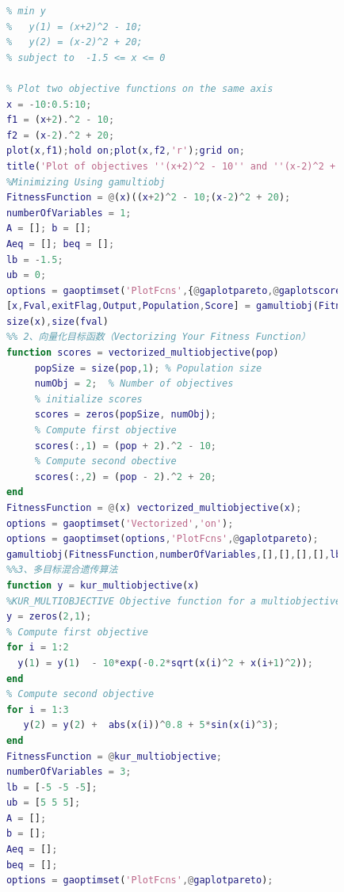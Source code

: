             \begin{lstlisting}[language = Matlab]
            %% 1、简单的多目标优化问题
            % min y
            %   y(1) = (x+2)^2 - 10;
            %   y(2) = (x-2)^2 + 20;
            % subject to  -1.5 <= x <= 0

            % Plot two objective functions on the same axis
            x = -10:0.5:10;
            f1 = (x+2).^2 - 10;
            f2 = (x-2).^2 + 20;
            plot(x,f1);hold on;plot(x,f2,'r');grid on;
            title('Plot of objectives ''(x+2)^2 - 10'' and ''(x-2)^2 + 20''');
            %Minimizing Using gamultiobj
            FitnessFunction = @(x)((x+2)^2 - 10;(x-2)^2 + 20);
            numberOfVariables = 1;
            A = []; b = [];
            Aeq = []; beq = [];
            lb = -1.5;
            ub = 0;
            options = gaoptimset('PlotFcns',{@gaplotpareto,@gaplotscorediversity});
            [x,Fval,exitFlag,Output,Population,Score] = gamultiobj(FitnessFunction,numberOfVariables,A,b,Aeq,beq,lb,ub,options);
            size(x),size(fval)
            %% 2、向量化目标函数（Vectorizing Your Fitness Function）
            function scores = vectorized_multiobjective(pop)
                 popSize = size(pop,1); % Population size
                 numObj = 2;  % Number of objectives
                 % initialize scores
                 scores = zeros(popSize, numObj);
                 % Compute first objective
                 scores(:,1) = (pop + 2).^2 - 10;
                 % Compute second obective
                 scores(:,2) = (pop - 2).^2 + 20;
            end
            FitnessFunction = @(x) vectorized_multiobjective(x);
            options = gaoptimset('Vectorized','on');
            options = gaoptimset(options,'PlotFcns',@gaplotpareto);
            gamultiobj(FitnessFunction,numberOfVariables,[],[],[],[],lb,ub,options);
            %%3、多目标混合遗传算法
            function y = kur_multiobjective(x)
            %KUR_MULTIOBJECTIVE Objective function for a multiobjective problem.
            y = zeros(2,1);
            % Compute first objective
            for i = 1:2
              y(1) = y(1)  - 10*exp(-0.2*sqrt(x(i)^2 + x(i+1)^2));
            end
            % Compute second objective
            for i = 1:3
               y(2) = y(2) +  abs(x(i))^0.8 + 5*sin(x(i)^3);
            end
            FitnessFunction = @kur_multiobjective;
            numberOfVariables = 3;
            lb = [-5 -5 -5];
            ub = [5 5 5];
            A = [];
            b = [];
            Aeq = [];
            beq = [];
            options = gaoptimset('PlotFcns',@gaplotpareto);

\end{lstlisting}
